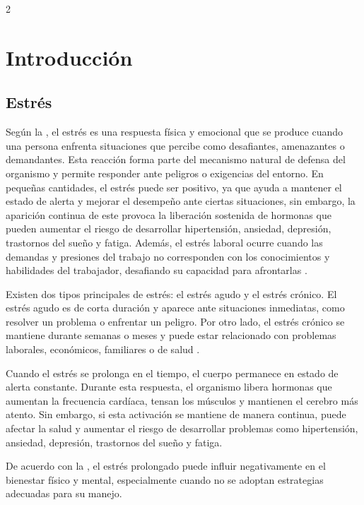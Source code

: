     \begin{multicols}{2}
    

\section{Introducción}

\subsection{Estrés}

Según la \citet{medlineplus2024}, el estrés es una respuesta física y emocional que se produce cuando una persona enfrenta situaciones que percibe como desafiantes, amenazantes o demandantes. Esta reacción forma parte del mecanismo natural de defensa del organismo y permite responder ante peligros o exigencias del entorno. En pequeñas cantidades, el estrés puede ser positivo, ya que ayuda a mantener el estado de alerta y mejorar el desempeño ante ciertas situaciones, sin embargo, la aparición continua de este provoca la liberación sostenida de hormonas que pueden aumentar el riesgo de desarrollar hipertensión, ansiedad, depresión, trastornos del sueño y fatiga. Además, el estrés laboral ocurre cuando las demandas y presiones del trabajo no corresponden con los conocimientos y habilidades del trabajador, desafiando su capacidad para afrontarlas \citep{who2020}.

Existen dos tipos principales de estrés: el estrés agudo y el estrés crónico. El estrés agudo es de corta duración y aparece ante situaciones inmediatas, como resolver un problema o enfrentar un peligro. Por otro lado, el estrés crónico se mantiene durante semanas o meses y puede estar relacionado con problemas laborales, económicos, familiares o de salud \citep{apa2010}.

Cuando el estrés se prolonga en el tiempo, el cuerpo permanece en estado de alerta constante. Durante esta respuesta, el organismo libera hormonas que aumentan la frecuencia cardíaca, tensan los músculos y mantienen el cerebro más atento. Sin embargo, si esta activación se mantiene de manera continua, puede afectar la salud y aumentar el riesgo de desarrollar problemas como hipertensión, ansiedad, depresión, trastornos del sueño y fatiga. 

De acuerdo con la \citet{medlineplus2024}, el estrés prolongado puede influir negativamente en el bienestar físico y mental, especialmente cuando no se adoptan estrategias adecuadas para su manejo.


\end{multicols}
